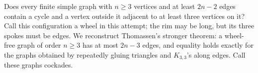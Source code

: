 Does every finite simple graph with \(n\geq3\) vertices and at least \(2n-2\) edges contain a cycle and a vertex outside it adjacent to at least three vertices on it?
Call this configuration a wheel in this attempt; the rim may be long, but its three spokes must be edges.
We reconstruct Thomassen's stronger theorem: a wheel-free graph of order \(n\geq3\) has at most \(2n-3\) edges, and equality holds exactly for the graphs obtained by repeatedly gluing triangles and \(K_{3,3}\)'s along edges. Call these graphs cockades.
